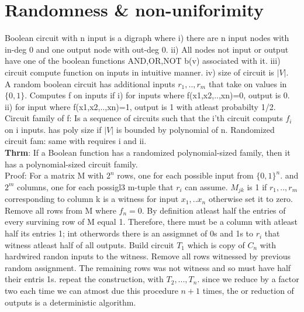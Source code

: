 \documentclass[a4paper]{article}
\begin{document}
\section{Randomness \& non-uniforimity}
Boolean circuit with n input is a digraph where i) there are n input nodes with in-deg 0 and one output node with out-deg 0. ii) All nodes not input or output have one of the boolean functions AND,OR,NOT b(v) associated with it. iii) circuit compute function on inputs in intuitive manner. iv) size of circuit is \(|V|\).\\
A random boolean circuit has additional inputs \(r_1,..,r_m\) that take on values in \(\{0,1\}\). Computes f on inputs if i) for inputs where f(x1,x2,..,xn)=0, output is 0. ii) for input where f(x1,x2,..,xn)=1, output is 1 with atleast probabilty 1/2.\\
Circuit family of f: Is a sequence of circuits such that the i'th circuit computs \(f_i\) on i inputs. has poly size if \(|V|\) is bounded by polynomial of n. Randomized circuit fam: same with requires i and ii.\\ 
\textbf{Thrm}: If a Boolean function has a randomized polynomial-sized family, then it has a polynomial-sized circuit family.\\
Proof: For a matrix M with \(2^n\) rows, one for each possible input from \(\{0,1\}^n\). and \(2^m\) columns, one for each possigl3 m-tuple that \(r_i\) can assume. \(M_{jk}\) is 1 if \(r_1,..,r_m\) corresponding to column k is a witness for input \(x_1,..x_n\) otherwise set it to zero. Remove all rows from M where \(f_n=0\). By definition atleast half the entries of every survining row of M equal 1. Therefore, there must be a column with atleast half its entries 1; int otherwords there is an assigmnet of 0s and 1s to \(r_i\) that witness atleast half of all outputs. Build circuit \(T_1\) which is copy of \(C_n\) with hardwired randon inputs to the witness. Remove all rows witnessed by previous random assignment. The remaining rows was not witness and so must have half their entris 1s. repeat the construction, with \(T_2,...,T_n\). since we reduce by a factor two each time we can atmost due this procedure \(n+1\) times, the or reduction of outputs is a deterministic algorithm. 
\end{document}
